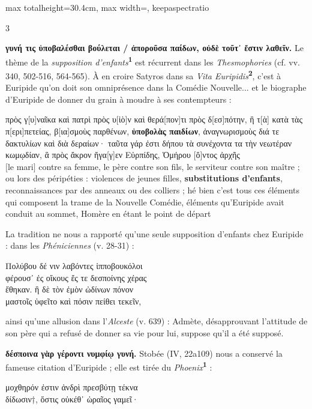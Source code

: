 \documentclass[11pt,twoside]{book}
\newcommand{\italique}[1]{\textit{#1}}
\newcommand{\citComm}[1]{\begin{quoting}[vskip=0.4pt,leftmargin=0.7em,rightmargin=0.2em]#1\end{quoting}}
\newcommand{\francais}[1]{{\policeFr #1}}
\newcommand{\marqueur}[1]{\textsuperscript{\color{rubricRed}\textbf{#1}}}
\begin{document}
\begin{adjustbox}{max totalheight=30.4cm, max width=\textwidth, keepaspectratio}
\begin{minipage}{\textwidth}
{\begin{multicols}{3}
\par\vspace{1.5pt}
 \textbf{γυνή τις ὑποβαλέσθαι βούλεται / ἀποροῦσα παίδων, οὐδὲ τοῦτ᾽ ἔστιν λαθεῖν.} Le thème de la \italique{supposition d'enfants}\marqueur{1} est récurrent dans les \italique{Thesmophories} (cf. vv. 340, 502-516, 564-565). À en croire Satyros dans sa \italique{Vita Euripidis}\marqueur{2}, c'est à Euripide qu'on doit son omniprésence dans la Comédie Nouvelle... et le biographe d'Euripide de donner du grain à moudre à ses contempteurs :
\citComm{πρὸς γ[υ]ναῖκα καὶ πατρὶ πρὸς υ[ἱὸ]ν καὶ θερά[πον]τι πρὸς δ[εσ]πότην, ἢ τ[ὰ] κατὰ τὰς π[ερι]πετείας, β[ια]σμοὺς παρθένων, \textbf{ὑποβολὰς παιδίων}, ἀναγνωρισμοὺς διά τε δακτυλίων καὶ διὰ δεραίων· ταῦτα γάρ ἐστι δήπου τὰ συνέχοντα τα τὴν νεωτέραν κωμῳδίαν, ἃ πρὸς ἄκρον ἤγα[γ]εν Εὐρπίδης, Ὁμήρου [ὄ]ντος ἀρχῆς\\
\francais{$[$le mari$]$ contre sa femme, le père contre son fils, le serviteur contre son maître ; ou lors des péripéties : violences de jeunes filles, \textbf{substitutions d'enfants}, reconnaissances par des anneaux ou des colliers ; hé bien c'est tous ces éléments qui composent la trame de la Nouvelle Comédie, éléments qu'Euripide avait conduit au sommet, Homère en étant le point de départ}}
\par\vspace{1.5pt}
\noindent La tradition ne nous a rapporté qu'une seule supposition d'enfants chez Euripide : dans les \italique{Phéniciennes} (v. 28-31) :
\citComm{Πολύβου δέ νιν λαβόντες ἱπποβουκόλοι\\
φέρουσ᾽ ἐς οἴκους ἔς τε δεσποίνης χέρας\\
ἔθηκαν. ἣ δὲ τὸν ἐμὸν ὠδίνων πόνον\\
μαστοῖς ὑφεῖτο καὶ πόσιν πείθει τεκεῖν,}
\par\vspace{1.5pt}
\noindent ainsi qu'une allusion dans l'\italique{Alceste} (v. 639) : Admète, désapprouvant l'attitude de son père qui a refusé de donner sa vie pour lui, suppose qu'il a été supposé.
\par\vspace{1.5pt}
 \textbf{δέσποινα γὰρ γέροντι νυμφίῳ γυνή.} Stobée (IV, 22a109) nous a conservé la fameuse citation d'Euripide ; elle est tirée du \italique{Phoenix}\marqueur{1} :
\citComm{μοχθηρόν ἐστιν ἀνδρὶ πρεσβύτῃ τέκνα\\
δίδωσιν†, ὅστις οὐκέθ᾽ ὡραῖος γαμεῖ·\\
}
\end{multicols}}
\end{minipage}
\end{adjustbox}
\end{document}

